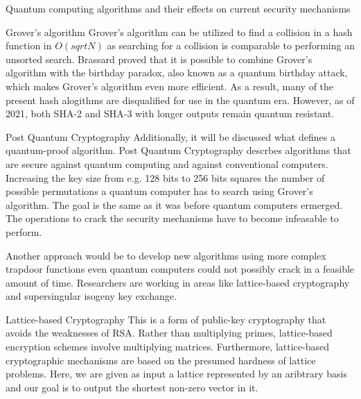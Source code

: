 \documentclass[aps,preprintnumbers,twocolumn]{revtex4}
\begin{document}
\begin{section}{Quantum computing algorithms and their effects on current security mechanisms}
\begin{subsection}{Grover's algorithm}
Grover's algorithm can be utilized to find a collision in a hash function in $O(sqrt{N})$ as searching for a collision is comparable to performing an unsorted search.
Brassard proved \cite{1998} that it is possible to combine Grover's algorithm with the birthday paradox, 
also known as a quantum birthday attack, which makes Grover's algorithm even more efficient. 
As a result, many of the present hash alogithms are disqualified for use in the quantum era. 
However, as of 2021, both SHA-2 and SHA-3 with longer outputs remain quantum resistant.
\end{subsection}

\end{section}

\begin{section}{Post Quantum Cryptography}
Additionally, it will be discussed what defines a quantum-proof algorithm. 
Post Quantum Cryptography descrbes algorithms that are secure against quantum computing and against conventional computers.
Increasing the key size from e.g. 128 bits to 256 bits squares the number of possible permutations a quantum computer has to search using Grover's algorithm.
The goal is the same as it was before quantum computers ermerged.
The operations to crack the security mechanisms have to become infeasable to perform. 

Another approach would be to develop new algorithms using more complex trapdoor functions even quantum computers could not possibly crack in a feasible amount of time. 
Researchers are working in areas like lattice-based cryptography and supersingular isogeny key exchange. 

\begin{subsection}{Lattice-based Cryptography}
This is a form of public-key cryptography that avoids the weaknesses of RSA. 
Rather than multiplying primes, lattice-based encryption schemes involve multiplying matrices. 
Furthermore, lattice-based cryptographic mechanisms are based on the presumed hardness of lattice problems. 
Here, we are given as input a lattice represented by an aribtrary basis and our goal is to output the shortest non-zero vector in it.
\end{subsection}

\end{section}
\end{document}
